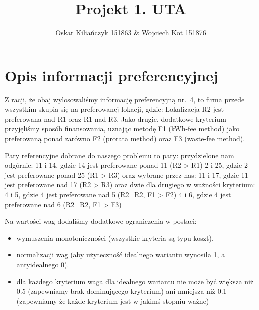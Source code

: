 \documentclass[11pt]{article}
\title{Projekt 1. UTA}
\author{Oskar Kiliańczyk 151863 \& Wojciech Kot 151876}
\date{}
\begin{document}
\maketitle
\newpage

\section{Opis informacji preferencyjnej}\label{sec:opis-informacji-preferencyjnej}

Z racji, że obaj wylosowaliśmy informację preferencyjną nr.\ 4, to firma przede wszystkim skupia się na preferowanej lokacji, gdzie:
Lokalizacja R2 jest preferowana nad R1 oraz R1 nad R3.
Jako drugie, dodatkowe kryterium przyjęliśmy sposób finansowania,
uznając metodę F1 (kWh-fee method) jako preferowaną ponad zarówno F2 (prorata method) oraz F3 (waste-fee method).


Pary referencyjne dobrane do naszego problemu to pary:
    przydzielone nam odgórnie:
    11 i 14, gdzie 14 jest preferowane ponad 11 (R2 > R1)
    2 i 25, gdzie 2 jest preferowane ponad 25 (R1 > R3)
    oraz wybrane przez nas:
    11 i 17, gdzie 11 jest preferowane nad 17 (R2 > R3)
    oraz dwie dla drugiego w ważności kryterium:
    4 i 5, gdzie 4 jest preferowane nad 5 (R2=R2, F1 > F2)
    4 i 6,  gdzie 4 jest preferowane nad 6 (R2=R2, F1 > F3)

Na wartości wag dodaliśmy dodatkowe ograniczenia w postaci:
\begin{itemize}
\item wymuszenia monotoniczności (wszystkie kryteria są typu koszt).
\item normalizacji wag (aby użyteczność idealnego wariantu wynosiła 1, a antyidealnego 0).
\item dla każdego kryterium waga dla idealnego wariantu nie może być większa niż 0.5 (zapewniamy brak dominującego kryterium)
ani mniejsza niż 0.1 (zapewniamy że każde kryterium jest w jakimś stopniu ważne)
\end{itemize}
\end{document}
